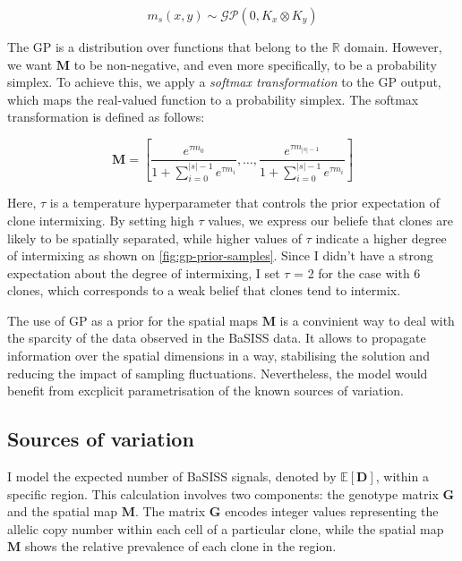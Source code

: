 \begin{equation}
    m_s(x,y) \sim \mathcal{GP}(0, K_x \otimes K_y)
\end{equation}

The \ac{GP} is a distribution over functions that belong to the $\mathbb{R}$ domain. However, 
we want $\mathbf{M}$ to be non-negative, and even more specifically, to be a probability simplex. To achieve this, we apply a \emph{softmax transformation} to the \ac{GP} output, which maps the real-valued function to a probability simplex. The softmax transformation is defined as follows:

\begin{equation}
    \mathbf{M} = \left[ \dfrac{e^{\tau m_0}}{1 + \sum_{i=0}^{|s|-1}{e^{\tau m_i}}}, \dots, \dfrac{e^{\tau m_{|s|-1}}}{1 + \sum_{i=0}^{|s|-1}{e^{\tau m_i}}} \right]
\end{equation}

Here, $\tau$ is a temperature hyperparameter that controls the prior expectation of clone intermixing. By setting high $\tau$ values, we express our beliefe that clones are likely to be spatially separated, while higher values of $\tau$ indicate a higher degree of intermixing as shown on \cref{fig:gp-prior-samples}. Since I didn't have a strong expectation about the degree of intermixing, I set $\tau$ = 2 for the case with 6 clones, which corresponds to a weak belief that clones tend to intermix.

The use of \ac{GP} as a prior for the spatial maps $\mathbf{M}$ is a convinient way to deal with the sparcity of the data observed in the \ac{BaSISS} data. It allows to propagate information over the spatial dimensions in a  way, stabilising the solution and reducing the impact of sampling fluctuations. Nevertheless, the model would benefit from excplicit parametrisation of the known sources of variation.

\subsection{Sources of variation}

I model the expected number of \ac{BaSISS} signals, denoted by $\mathbb{E}[\mathbf{D}]$, within a specific region. This calculation involves two components: the genotype matrix $\mathbf{G}$ and the spatial map $\mathbf{M}$. The matrix $\mathbf{G}$ encodes integer values representing the allelic copy number within each cell of a particular clone, while the spatial map $\mathbf{M}$ shows the relative prevalence of each clone in the region.

